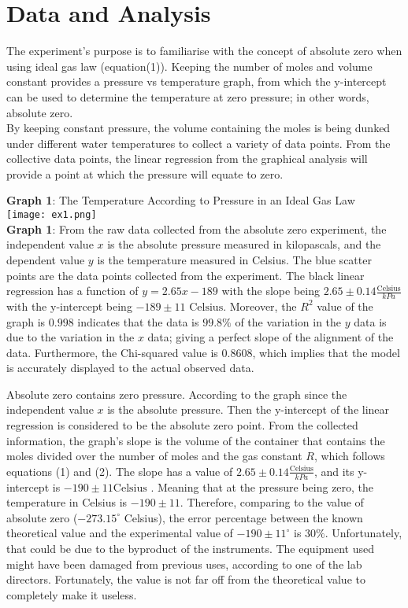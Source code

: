 \documentclass[11pt]{article}
\begin{document}
\section*{Data and Analysis}
The experiment's purpose is to familiarise with the concept of absolute zero when using ideal gas law (equation(1)). Keeping the number of moles and volume constant provides a pressure vs temperature graph, from which the y-intercept can be used to determine the temperature at zero pressure; in other words, absolute zero.\\
By keeping constant pressure, the volume containing the moles is being dunked under different water temperatures to collect a variety of data points. From the collective data points, the linear regression from the graphical analysis will provide a point at which the pressure will equate to zero. 
\begin{center}
    \textbf{Graph 1}: The Temperature According to Pressure in an Ideal Gas Law \\
    \texttt{[image: ex1.png]}\\\textbf{Graph 1}: From the raw data collected from the absolute zero experiment, the independent value $x$ is the absolute pressure measured in kilopascals, and the dependent value $y$ is the temperature measured in Celsius. The blue scatter points are the data points collected from the experiment. The black linear regression has a function of $y=2.65x-189$ with the slope being $2.65\pm 0.14 \frac{\text{Celsius}}{kPa}$ with the y-intercept being $-189\pm 11 \text{ Celsius}$. Moreover, the $R^2$ value of the graph is $0.998$ indicates that the data is $99.8\%$ of the variation in the $y$ data is due to the variation in the $x$ data; giving a perfect slope of the alignment of the data. Furthermore, the Chi-squared value is $0.8608$, which implies that the model is accurately displayed to the actual observed data. 
\end{center}
Absolute zero contains zero pressure. According to the graph since the independent value $x$ is the absolute pressure. Then the y-intercept of the linear regression is considered to be the absolute zero point. From the collected information, the graph's slope is the volume of the container that contains the moles divided over the number of moles and the gas constant $R$, which follows equations (1) and (2). The slope has a value of $2.65\pm0.14 \frac{\text{Celsius}}{kPa}$, and its y-intercept is $-190\pm11 \text{Celsius}$ . Meaning that at the pressure being zero, the temperature in Celsius is $-190\pm11$. Therefore, comparing to the value of absolute zero ($-273.15^\circ$ Celsius), the error percentage between the known theoretical value and the experimental value of $-190\pm11^\circ$ is $30\%$.  Unfortunately, that could be due to the byproduct of the instruments. The equipment used might have been damaged from previous uses, according to one of the lab directors. Fortunately, the value is not far off from the theoretical value to completely make it useless. \\
\end{document}
